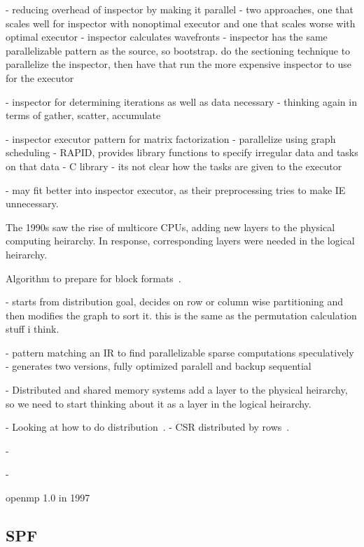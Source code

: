 \cite{leung1993improving}
- reducing overhead of inspector by making it parallel
- two approaches, one that scales well for inspector with nonoptimal executor and one that scales worse with optimal executor
- inspector calculates wavefronts
- inspector has the same parallelizable pattern as the source, so bootstrap. do the sectioning technique to parallelize the inspector, then have that run the more expensive inspector to use for the executor


\cite{das1994communication}
- inspector for determining iterations as well as data necessary
- thinking again in terms of gather, scatter, accumulate

\cite{fu1996run}
- inspector executor pattern for matrix factorization
- parallelize using graph scheduling
- RAPID, provides library functions to specify irregular data and tasks on that data
- C library
- its not clear how the tasks are given to the executor


\cite{ujaldon1996parallelization}
- may fit better into inspector executor, as their preprocessing tries to make IE unnecessary.


The 1990s saw the rise of multicore CPUs, adding new layers to the physical computing heirarchy. 
In response, corresponding layers were needed in the logical heirarchy.

Algorithm to prepare for block formats~\cite{pothen1990computing}.

\cite{catalyurek1999hypergraph}
- starts from distribution goal, decides on row or column wise partitioning and then modifies the graph to sort it. this is the same as the permutation calculation stuff i think.


\cite{kessler1999sparamat}
- pattern matching an IR to find parallelizable sparse computations speculatively
- generates two versions, fully optimized paralell and backup sequential


- Distributed and shared memory systems add a layer to the physical heirarchy, so we need to start thinking about it as a layer in the logical heirarchy. %

- Looking at how to do distribution~\cite{ogielski1993sparse}.
- CSR distributed by rows~\cite{erhel1995parallel}.

- 
\cite{filippone2000psblas}

- 

openmp 1.0 in 1997~\cite{dagum1998openmp}

\subsection{SPF}

